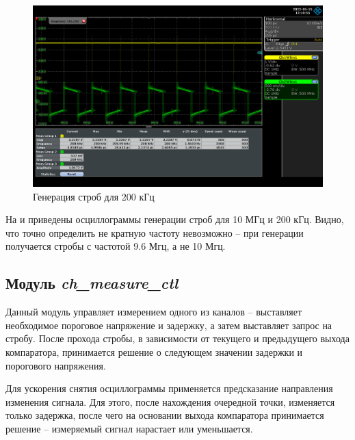 \begin{figure}[ht!] 
	\center
	\includegraphics  [scale=0.3] {my_folder/images//stb_200khz}
	\caption{Генерация строб для 200 кГц} 
	\label{fig:stb-200khz}  
\end{figure}

\FloatBarrier

На  и  приведены осциллограммы генерации строб для 10 МГц и 200 кГц.
Видно, что точно определить не кратную частоту невозможно -- при генерации получается стробы с частотой 9.6 Мгц, а не 10 Мгц.

\subsection{Модуль \emph{ch\_measure\_ctl}}

Данный модуль управляет измерением одного из каналов -- выставляет необходимое пороговое напряжение и задержку, а
затем выставляет запрос на стробу. После прохода стробы, в зависимости от текущего и предыдущего выхода компаратора, принимается решение
о следующем значении задержки и порогового напряжения.

Для ускорения снятия осциллограммы применяется предсказание направления изменения сигнала. Для этого, после нахождения очередной точки,
изменяется только задержка, после чего на основании выхода компаратора принимается решение -- измеряемый сигнал нарастает или уменьшается.

